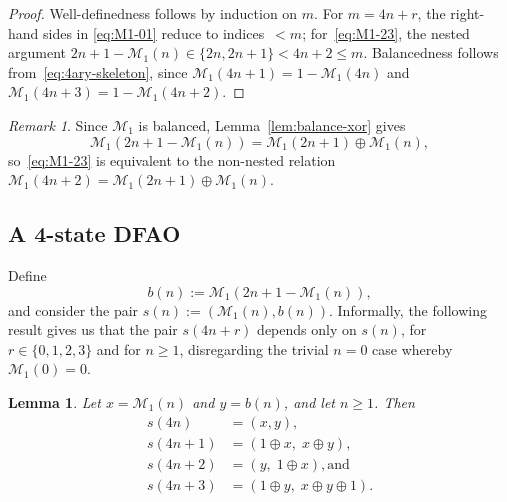 \documentclass[12pt,reqno]{article}
\theoremstyle{plain}
\newtheorem{lemma}[theorem]{Lemma}
\theoremstyle{definition}
\theoremstyle{remark}
\newtheorem{remark}[theorem]{Remark}
\begin{document}
\begin{proof}
 Well-definedness follows by induction on $m$. For $m=4n+r$, the right-hand sides in \eqref{eq:M1-01} reduce to indices~$<m$; 
 for~\eqref{eq:M1-23}, the nested
 argument $2n+1-\mathcal{M}_{1}(n)\in\{2n,2n+1\}<4n+2\le m$. Balancedness follows
 from~\eqref{eq:4ary-skeleton}, since $\mathcal{M}_{1}(4n+1)=1-\mathcal{M}_{1}(4n)$
 and $\mathcal{M}_{1}(4n+3)=1-\mathcal{M}_{1}(4n+2)$.
\end{proof}

\begin{remark}
 Since $\mathcal{M}_{1}$ is balanced, Lemma~\ref{lem:balance-xor} gives
\[
\mathcal{M}_{1}(2n+1-\mathcal{M}_{1}(n)) = \mathcal{M}_{1}(2n+1)\oplus \mathcal{M}_{1}(n),
\]
 so~\eqref{eq:M1-23} is equivalent to the non-nested relation
 $\mathcal{M}_{1}(4n+2) = \mathcal{M}_{1}(2n+1)\oplus\mathcal{M}_{1}(n)$.
\end{remark}

\subsection{A 4-state DFAO}
 Define 
\begin{equation}\label{eq:b1} 
 b(n):=\mathcal{M}_{1}(2n+1-\mathcal{M}_{1}(n)), 
\end{equation}
 and consider the pair $s(n):=(\mathcal{M}_{1}(n), b(n))$. Informally, the following result gives us that the pair $s(4n+r)$ depends only 
 on $s(n)$, 
 for $r\in\{0, 1, 2, 3\}$ and for $n \geq 1$, disregarding the trivial $n = 0$ case whereby 
 $\mathcal{M}_{1}(0)=0$. 

 \begin{lemma}\label{lem:M1-closure} 
 Let $x=\mathcal{M}_{1}(n)$ and $y=b(n)$, and let $n \geq 1$. Then 
\begin{align}
 s(4n) & = (x, y), \label{s4n} \\ 
 s(4n + 1) & = (1 \oplus x,\; x \oplus y), \label{4np1} \\ 
 s(4 n + 2) & = (y,\; 1 \oplus x), \text{and} \label{4np2} \\
 s(4n + 3) & = (1 \oplus y,\; x \oplus y \oplus 1). \label{4np3} 
\end{align}
 \end{lemma}
\end{document}
